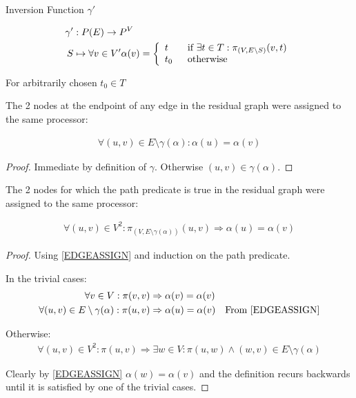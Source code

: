 \documentclass{article}
\begin{document}
\begin{definition}
Inversion Function $\gamma'$

\begin{align}
	\nonumber \gamma' & : P(E) \rightarrow P^V \\
	\nonumber S & \mapsto \forall v \in V' \alpha(v) = \mbox{$\left\{ 
		\begin{array}{l l}
			t \quad & \mbox{if $\exists t \in T : \pi_{(V, E \setminus S)} (v, t)$}\\
			t_0 & \mbox{otherwise}\\ \end{array} \right.$} 
\end{align}

For arbitrarily chosen $t_0 \in T$
\end{definition}

\begin{lemma}
\label{EDGEASSIGN}
The 2 nodes at the endpoint of any edge in the residual graph were assigned to the same processor:

\begin{align}
	\nonumber \forall(u, v) \in E \setminus \gamma(\alpha) : \alpha(u) = \alpha(v)
\end{align}
\end{lemma}
\begin{proof}
Immediate by definition of $\gamma$.
Otherwise $(u, v) \in \gamma(\alpha)$.
\end{proof}

\begin{lemma}
\label{PATHASSIGN}
The 2 nodes for which the path predicate is true in the residual graph were assigned to the same processor:

\begin{align}
	\nonumber \forall (u, v) \in V^2 : \pi_{(V, E \setminus \gamma(\alpha))}(u,v) \Rightarrow \alpha(u) = \alpha(v)
\end{align}
\end{lemma}
\begin{proof}
Using \ref{EDGEASSIGN} and induction on the path predicate.

In the trivial cases:
\begin{align}
	\nonumber \forall v \in V : \pi(v, v) & \Rightarrow \alpha(v) = \alpha(v) \\
	\nonumber \forall (u, v) \in E \setminus \gamma(\alpha) : \pi(u, v) & \Rightarrow \alpha(u) = \alpha(v) \quad \mbox{From \ref{EDGEASSIGN}}
\end{align}

Otherwise:
\begin{align}
	\nonumber \forall (u, v) \in V^2 : \pi(u, v) \Rightarrow \exists w \in V : \pi(u, w) \wedge (w, v) \in E \setminus \gamma(\alpha)
\end{align}

Clearly by \ref{EDGEASSIGN} $\alpha(w) = \alpha(v)$ and the definition recurs backwards until it is satisfied by one of the trivial cases.

\end{proof}
\end{document}
